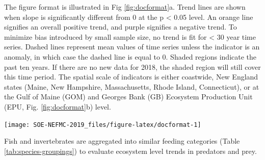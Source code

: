 \documentclass[10pt,]{article}
\let\origfigure\figure
\let\endorigfigure\endfigure
\renewenvironment{figure}[1][2] {
    \expandafter\origfigure\expandafter[H]
} {
    \endorigfigure
}
\begin{document}
The figure format is illustrated in Fig \ref{fig:docformat}a. Trend
lines are shown when slope is significantly different from 0 at the p
\textless{} 0.05 level. An orange line signifies an overall positive
trend, and purple signifies a negative trend. To minimize bias
introduced by small sample size, no trend is fit for \textless{} 30 year
time series. Dashed lines represent mean values of time series unless
the indicator is an anomaly, in which case the dashed line is equal to
0. Shaded regions indicate the past ten years. If there are no new data
for 2018, the shaded region will still cover this time period. The
spatial scale of indicators is either coastwide, New England states
(Maine, New Hampshire, Massachusetts, Rhode Island, Connecticut), or at
the Gulf of Maine (GOM) and Georges Bank (GB) Ecosystem Production Unit
(EPU, Fig. \ref{fig:docformat}b) level.

\begin{figure}

{\centering \texttt{[image: SOE-NEFMC-2019\_files/figure-latex/docformat-1]} 

}

\caption{Document orientation. a. Key to figures. b.The Northeast Large Marine Ecosystem.}\label{fig:docformat}
\end{figure}

Fish and invertebrates are aggregated into similar feeding categories
(Table \ref{tab:species-groupings}) to evaluate ecosystem level trends
in predators and prey.
\end{document}
